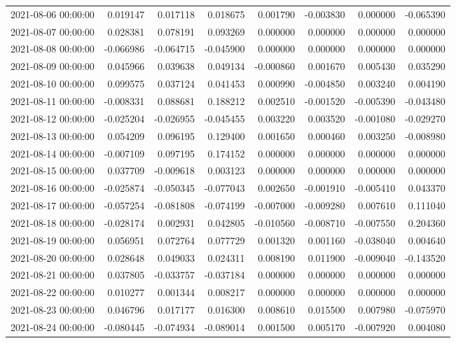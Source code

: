 \begin{tabular}{lrrrrrrr}
2021-08-06 00:00:00 & 0.019147 & 0.017118 & 0.018675 & 0.001790 & -0.003830 & 0.000000 & -0.065390 \\
2021-08-07 00:00:00 & 0.028381 & 0.078191 & 0.093269 & 0.000000 & 0.000000 & 0.000000 & 0.000000 \\
2021-08-08 00:00:00 & -0.066986 & -0.064715 & -0.045900 & 0.000000 & 0.000000 & 0.000000 & 0.000000 \\
2021-08-09 00:00:00 & 0.045966 & 0.039638 & 0.049134 & -0.000860 & 0.001670 & 0.005430 & 0.035290 \\
2021-08-10 00:00:00 & 0.099575 & 0.037124 & 0.041453 & 0.000990 & -0.004850 & 0.003240 & 0.004190 \\
2021-08-11 00:00:00 & -0.008331 & 0.088681 & 0.188212 & 0.002510 & -0.001520 & -0.005390 & -0.043480 \\
2021-08-12 00:00:00 & -0.025204 & -0.026955 & -0.045455 & 0.003220 & 0.003520 & -0.001080 & -0.029270 \\
2021-08-13 00:00:00 & 0.054209 & 0.096195 & 0.129400 & 0.001650 & 0.000460 & 0.003250 & -0.008980 \\
2021-08-14 00:00:00 & -0.007109 & 0.097195 & 0.174152 & 0.000000 & 0.000000 & 0.000000 & 0.000000 \\
2021-08-15 00:00:00 & 0.037709 & -0.009618 & 0.003123 & 0.000000 & 0.000000 & 0.000000 & 0.000000 \\
2021-08-16 00:00:00 & -0.025874 & -0.050345 & -0.077043 & 0.002650 & -0.001910 & -0.005410 & 0.043370 \\
2021-08-17 00:00:00 & -0.057254 & -0.081808 & -0.074199 & -0.007000 & -0.009280 & 0.007610 & 0.111040 \\
2021-08-18 00:00:00 & -0.028174 & 0.002931 & 0.042805 & -0.010560 & -0.008710 & -0.007550 & 0.204360 \\
2021-08-19 00:00:00 & 0.056951 & 0.072764 & 0.077729 & 0.001320 & 0.001160 & -0.038040 & 0.004640 \\
2021-08-20 00:00:00 & 0.028648 & 0.049033 & 0.024311 & 0.008190 & 0.011900 & -0.009040 & -0.143520 \\
2021-08-21 00:00:00 & 0.037805 & -0.033757 & -0.037184 & 0.000000 & 0.000000 & 0.000000 & 0.000000 \\
2021-08-22 00:00:00 & 0.010277 & 0.001344 & 0.008217 & 0.000000 & 0.000000 & 0.000000 & 0.000000 \\
2021-08-23 00:00:00 & 0.046796 & 0.017177 & 0.016300 & 0.008610 & 0.015500 & 0.007980 & -0.075970 \\
2021-08-24 00:00:00 & -0.080445 & -0.074934 & -0.089014 & 0.001500 & 0.005170 & -0.007920 & 0.004080 \\

\end{tabular}
